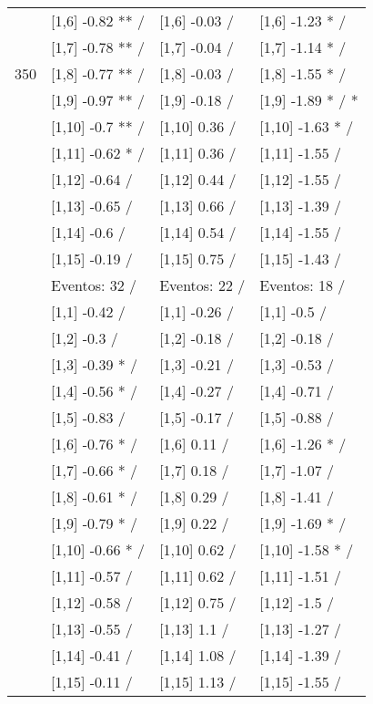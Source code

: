\begin{table}
\begin{tabular}[t]{llll}
 & {}[1,6] -0.82 ** / & {}[1,6] -0.03  / & {}[1,6] -1.23 * /\\
 & {}[1,7] -0.78 ** / & {}[1,7] -0.04  / & {}[1,7] -1.14 * /\\
350 & {}[1,8] -0.77 ** / & {}[1,8] -0.03  / & {}[1,8] -1.55 * /\\
\addlinespace
 & {}[1,9] -0.97 ** / & {}[1,9] -0.18  / & {}[1,9] -1.89 * / *\\
 & {}[1,10] -0.7 ** / & {}[1,10] 0.36  / & {}[1,10] -1.63 * /\\
 & {}[1,11] -0.62 * / & {}[1,11] 0.36  / & {}[1,11] -1.55  /\\
 & {}[1,12] -0.64  / & {}[1,12] 0.44  / & {}[1,12] -1.55  /\\
 & {}[1,13] -0.65  / & {}[1,13] 0.66  / & {}[1,13] -1.39  /\\
\addlinespace
 & {}[1,14] -0.6  / & {}[1,14] 0.54  / & {}[1,14] -1.55  /\\
 & {}[1,15] -0.19  / & {}[1,15] 0.75  / & {}[1,15] -1.43  /\\
 & Eventos:  32 / & Eventos:  22 / & Eventos:  18 /\\
 & {}[1,1] -0.42  / & {}[1,1] -0.26  / & {}[1,1] -0.5  /\\
 & {}[1,2] -0.3  / & {}[1,2] -0.18  / & {}[1,2] -0.18  /\\
\addlinespace
 & {}[1,3] -0.39 * / & {}[1,3] -0.21  / & {}[1,3] -0.53  /\\
 & {}[1,4] -0.56 * / & {}[1,4] -0.27  / & {}[1,4] -0.71  /\\
 & {}[1,5] -0.83  / & {}[1,5] -0.17  / & {}[1,5] -0.88  /\\
 & {}[1,6] -0.76 * / & {}[1,6] 0.11  / & {}[1,6] -1.26 * /\\
 & {}[1,7] -0.66 * / & {}[1,7] 0.18  / & {}[1,7] -1.07  /\\
\addlinespace
500 & {}[1,8] -0.61 * / & {}[1,8] 0.29  / & {}[1,8] -1.41  /\\
 & {}[1,9] -0.79 * / & {}[1,9] 0.22  / & {}[1,9] -1.69 * /\\
 & {}[1,10] -0.66 * / & {}[1,10] 0.62  / & {}[1,10] -1.58 * /\\
 & {}[1,11] -0.57  / & {}[1,11] 0.62  / & {}[1,11] -1.51  /\\
 & {}[1,12] -0.58  / & {}[1,12] 0.75  / & {}[1,12] -1.5  /\\
\addlinespace
 & {}[1,13] -0.55  / & {}[1,13] 1.1  / & {}[1,13] -1.27  /\\
 & {}[1,14] -0.41  / & {}[1,14] 1.08  / & {}[1,14] -1.39  /\\
 & {}[1,15] -0.11  / & {}[1,15] 1.13  / & {}[1,15] -1.55  /\\
\bottomrule
\end{tabular}
\end{table}
